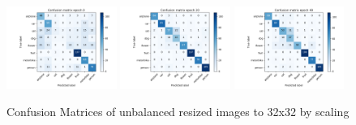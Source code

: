 \documentclass{article}
\begin{document}
\begin{figure}[!htb]
	\begin{center}
		\includegraphics[width=0.32\textwidth]{./figures/cm_h32_w32_r_none_e0.png}
		\includegraphics[width= 0.32\textwidth]{./figures/cm_h32_w32_r_none_e20.png}
		\includegraphics[width= 0.32\textwidth]{./figures/cm_h32_w32_r_none_e49.png}
		\caption{Confusion Matrices of unbalanced resized images to 32x32 by scaling}
	\end{center}
\end{figure}
\end{document}
